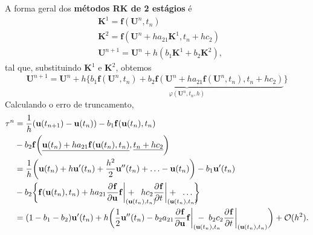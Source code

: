 \documentclass[../differential_methods.tex]{subfiles}
\begin{document}
A forma geral dos \textbf{métodos RK de 2 estágios} é
\begin{align*}
	 & \mathbf{K}^{1} = \mathbf{f}(\mathbf{U}^{n}, t_{n})                               \\
	 & \mathbf{K}^{2} = \mathbf{f}(\mathbf{U}^{n} + h a_{21}\mathbf{K}^{1}, t_{n}+hc_2) \\
	 & \mathbf{U}^{n+1} = \mathbf{U}^{n} + h (b_1 \mathbf{K}^{1} + b_2 \mathbf{K}^{2}),
\end{align*}
tal que, substituindo \(\mathbf{K}^{1}\) e \(\mathbf{K}^{2}\), obtemos
\[
	\boxed{\mathbf{U}^{n+1} = \mathbf{U}^{n} + h \{\underbrace{b_1 \mathbf{f}(\mathbf{U}^{n}, t_{n}) + b_2 \mathbf{f}(\mathbf{U}^{n} + h a_{21}\mathbf{f}(\mathbf{U}^{n}, t_{n}), t_{n}+ h c_2)}_{\varphi (\mathbf{U}^{n}, t_{n}, h)}\}}
\]
Calculando o erro de truncamento,
\begin{align*}
	\tau^{n} & = \frac{1}{h}(\mathbf{u}(t_{n+1}) - \mathbf{u}(t_{n})) - b_1 \mathbf{f}(\mathbf{u}(t_{n}), t_{n})                                                                                                                                                                                                                                             \\
	         & - b_2 \mathbf{f}\biggl(\underline{\mathbf{u}(t_{n})+ha_{21}\mathbf{f}(\mathbf{u}(t_{n}), t_{n})}, \underline{t_{n}+hc_2}\biggr)                                                                                                                                                                                                               \\
	         & = \frac{1}{h}\biggl(\mathbf{u}(t_{n}) + h \mathbf{u}'(t_{n}) + \frac{h^{2}}{2}\mathbf{u}''(t_{n}) + \dotsc - \mathbf{u}(t_{n})\biggr) - b_1 \mathbf{u}'(t_{n})                                                                                                                                                                                \\
	         & - b_2 \biggl\{\mathbf{f}(\mathbf{u}(t_{n}), t_{n}) + h a_{21}\frac{\partial^{}\mathbf{f}}{\partial \mathbf{u}^{}}\mathbf{f}\biggl|_{\mathrlap{(\mathbf{u}(t_{n}), t_{n})}}^{}\biggr. +\;\; h c_2 \frac{\partial^{}\mathbf{f}}{\partial t^{}}\biggl|_{\mathrlap{(\mathbf{u}(t_{n}), t_{n})}}^{}\biggr. +\;\; \dotsc \biggr\}                   \\
	         & = (1-b_1-b_2)\mathbf{u}'(t_{n}) + h \biggl(\frac{1}{2}\mathbf{u}''(t_{n}) - b_2a_{21}\frac{\partial^{}\mathbf{f}}{\partial \mathbf{u}^{}}\mathbf{f}\biggl|_{\mathrlap{(\mathbf{u}(t_{n}), t_{n}}}^{}\biggr. \;-\; b_2c_2 \frac{\partial^{}\mathbf{f}}{\partial t^{}}\biggl|_{(\mathbf{u}(t_{n}), t_{n})}^{}\biggr.\biggr)+\mathcal{O}(h^{2}).
\end{align*}
\end{document}
